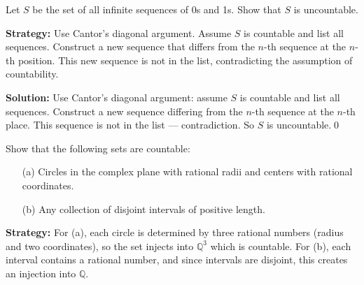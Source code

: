 \begin{problembox}
Let \( S \) be the set of all infinite sequences of 0s and 1s. Show that \( S \) is uncountable.
\end{problembox}

\noindent\textbf{Strategy:} Use Cantor's diagonal argument. Assume $S$ is countable and list all sequences. Construct a new sequence that differs from the $n$-th sequence at the $n$-th position. This new sequence is not in the list, contradicting the assumption of countability.

\bigskip\noindent\textbf{Solution:}  
Use Cantor's diagonal argument: assume \( S \) is countable and list all sequences.  
Construct a new sequence differing from the \( n \)-th sequence at the \( n \)-th place.  
This sequence is not in the list — contradiction. So \( S \) is uncountable.\qed



\begin{problembox}
Show that the following sets are countable:
\begin{itemize}
\item[(a)] Circles in the complex plane with rational radii and centers with rational coordinates.
\item[(b)] Any collection of disjoint intervals of positive length.
\end{itemize}
\end{problembox}

\noindent\textbf{Strategy:} For (a), each circle is determined by three rational numbers (radius and two coordinates), so the set injects into $\mathbb{Q}^3$ which is countable. For (b), each interval contains a rational number, and since intervals are disjoint, this creates an injection into $\mathbb{Q}$.

